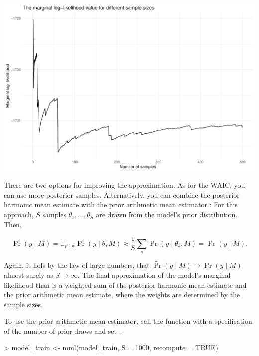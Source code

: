 \documentclass[article]{jss}
\newcommand{\fct}[1]{\code{#1()}}
\begin{document}
\begin{Schunk}
\end{Schunk}
\includegraphics{rprobitb_oelschlaeger_bauer-mmltrace}

There are two options for improving the approximation: As for the WAIC, you can use more posterior samples. Alternatively, you can combine the posterior harmonic mean estimate with the prior arithmetic mean estimator \citep{Hammersley:1964}: For this approach, $S$ samples $\theta_1,\dots,\theta_S$ are drawn from the model's prior distribution. Then,

$$\Pr(y\mid M) = \mathbb{E}_\text{prior} \Pr(y\mid \theta,M) \approx \frac{1}{S} \sum_s \Pr(y\mid \theta_s,M) = \tilde{\Pr}(y\mid M).$$

Again, it hols by the law of large numbers, that $\tilde{\Pr}(y\mid M) \to \Pr(y\mid M)$ almost surely as $S \to \infty$. The final approximation of the model's marginal likelihood than is a weighted sum of the posterior harmonic mean estimate and the prior arithmetic mean estimate, where the weights are determined by the sample sizes.

To use the prior arithmetic mean estimator, call the \fct{mml} function with a specification of the number of prior draws  and set :

\begin{Schunk}
\begin{Sinput}
> model_train <- mml(model_train, S = 1000, recompute = TRUE)
\end{Sinput}
\end{Schunk}
\end{document}
